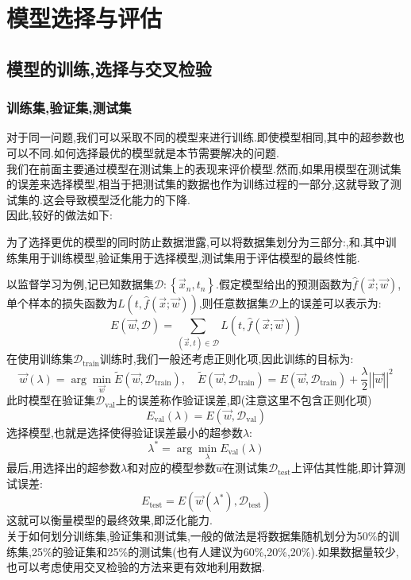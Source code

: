 \documentclass{ctexart}
\begin{document}
\setcounter{FormalCounter}{0}
\section{模型选择与评估}
\subsection{模型的训练,选择与交叉检验}
\subsubsection{训练集,验证集,测试集}
对于同一问题,我们可以采取不同的模型来进行训练.即使模型相同,其中的超参数也可以不同.如何选择最优的模型就是本节需要解决的问题.\\
\indent 我们在前面主要通过模型在测试集上的表现来评价模型.然而,如果用模型在测试集的误差来选择模型,相当于把测试集的数据也作为训练过程的一部分,这就导致了测试集的.这会导致模型泛化能力的下降.\\
\indent 因此,较好的做法如下:
\begin{definition}
    为了选择更优的模型的同时防止数据泄露,可以将数据集划分为三部分:,和.其中训练集用于训练模型,验证集用于选择模型,测试集用于评估模型的最终性能.
\end{definition}
以监督学习为例,记已知数据集$\mathcal{D}:\left\{\vec{x}_n,t_n\right\}$.假定模型给出的预测函数为$\hat{f}(\vec{x};\vec{w})$,单个样本的损失函数为$L(t,\hat{f}(\vec{x};\vec{w}))$,则任意数据集$\mathcal{D}$上的误差可以表示为:
\[E(\vec{w},\mathcal{D})=\sum_{(\vec{x},t)\in\mathcal{D}}L(t,\hat{f}(\vec{x};\vec{w}))\]
在使用训练集$\mathcal{D}_{\text{train}}$训练时,我们一般还考虑正则化项,因此训练的目标为:
\[\vec{w}(\lambda)=\arg\min_{\vec{w}}\tilde{E}\left(\vec{w},\mathcal{D}_{\text{train}}\right),\quad\tilde{E}\left(\vec{w},\mathcal{D}_{\text{train}}\right)=E\left(\vec{w},\mathcal{D}_{\text{train}}\right)+\dfrac{\lambda}{2}\left|\left|\vec{w}\right|\right|^2\]
此时模型在验证集$\mathcal{D}_{\text{val}}$上的误差称作验证误差,即(注意这里不包含正则化项)
\[E_{\text{val}}(\lambda)=E\left(\vec{w},\mathcal{D}_{\text{val}}\right)\]
选择模型,也就是选择使得验证误差最小的超参数$\lambda$:
\[\lambda^*=\arg\min_{\lambda}E_{\text{val}}(\lambda)\]
最后,用选择出的超参数$\lambda$和对应的模型参数$\vec{w}$在测试集$\mathcal{D}_{\text{test}}$上评估其性能,即计算测试误差:
\[E_{\text{test}}=E\left(\vec{w}(\lambda^*),\mathcal{D}_{\text{test}}\right)\]
这就可以衡量模型的最终效果,即泛化能力.\\
\indent 关于如何划分训练集,验证集和测试集,一般的做法是将数据集随机划分为50\%的训练集,25\%的验证集和25\%的测试集(也有人建议为60\%,20\%,20\%).如果数据量较少,也可以考虑使用交叉检验的方法来更有效地利用数据.
\end{document}
